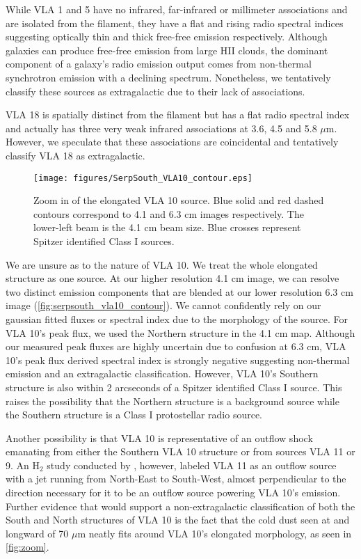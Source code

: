 \documentclass[apj]{emulateapj}
\begin{document}
While VLA 1 and 5 have no infrared, far-infrared or millimeter associations and are isolated from the filament, they have a flat and rising radio spectral indices suggesting optically thin and thick free-free emission respectively. Although galaxies can produce free-free emission from large HII clouds, the dominant component of a galaxy's radio emission output comes from non-thermal synchrotron emission with a declining spectrum. Nonetheless, we tentatively classify these sources as extragalactic due to their lack of associations. 

VLA 18 is spatially distinct from the filament but has a flat radio spectral index and actually has three very weak infrared associations at 3.6, 4.5 and 5.8 $\mu$m. However, we speculate that these associations are coincidental and tentatively classify VLA 18 as extragalactic. 

\begin{figure}
\label{fig:serpsouth_vla10_contour}
\centering
\texttt{[image: figures/SerpSouth\_VLA10\_contour.eps]}
\caption{\small{Zoom in of the elongated VLA 10 source. Blue solid and red dashed contours correspond to 4.1 and 6.3 cm images respectively. The lower-left beam is the 4.1 cm beam size. Blue crosses represent Spitzer identified Class I sources.
}}
\end{figure}

We are unsure as to the nature of VLA 10. We treat the whole elongated structure as one source. At our higher resolution 4.1 cm image, we can resolve two distinct emission components that are blended at our lower resolution 6.3 cm image (\autoref{fig:serpsouth_vla10_contour}). We cannot confidently rely on our gaussian fitted fluxes or spectral index due to the morphology of the source. For VLA 10's peak flux, we used the Northern structure in the 4.1 cm map. Although our measured peak fluxes are highly uncertain due to confusion at 6.3 cm, VLA 10's peak flux derived spectral index is strongly negative suggesting non-thermal emission and an extragalactic classification. However, VLA 10's Southern structure is also within 2 arcseconds of a Spitzer identified Class I source. This raises the possibility that the Northern structure is a background source while the Southern structure is a Class I protostellar radio source. 

Another possibility is that VLA 10 is representative of an outflow shock emanating from either the Southern VLA 10 structure or from sources VLA 11 or 9. An H$_{2}$ study conducted by \citet{Teixeira12}, however, labeled VLA 11 as an outflow source with a jet running from North-East to South-West, almost perpendicular to the direction necessary for it to be an outflow source powering VLA 10's emission. Further evidence that would support a non-extragalactic classification of both the South and North structures of VLA 10 is the fact that the cold dust seen at and longward of 70 $\mu$m neatly fits around VLA 10's elongated morphology, as seen in \autoref{fig:zoom}.
\end{document}
